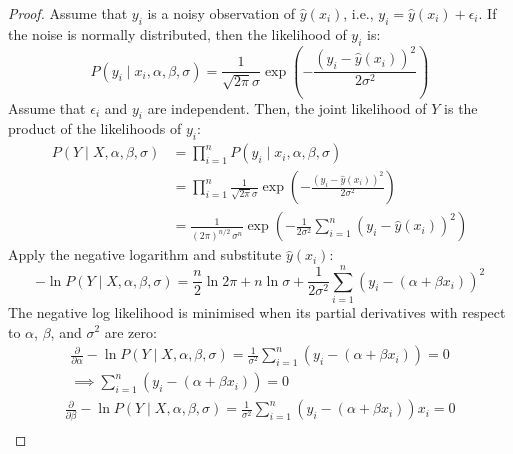 \begin{thm}
  \begin{proof}
    Assume that $y_i$ is a noisy observation of $\hat{y}(x_i)$, i.e.,
    $y_i = \hat{y}(x_i) + \epsilon_i$.
    If the noise is normally distributed, then the likelihood of $y_i$ is:
    \begin{equation}
      P(y_i \mid x_i, \alpha, \beta, \sigma)
      = \frac{1}{\sqrt{2 \pi} \sigma} \exp \left(
      - \frac{(y_i - \hat{y}(x_i))^2}{2 \sigma^2}
      \right)
    \end{equation}
    Assume that $\epsilon_i$ and $y_i$ are independent.
    Then, the joint likelihood of $Y$ is the product of the likelihoods of
    $y_i$:
    \begin{align}
      P(Y \mid X, \alpha, \beta, \sigma)
       & = \prod_{i = 1}^n P(y_i \mid x_i, \alpha, \beta, \sigma)    \\
       & = \prod_{i = 1}^n \frac{1}{\sqrt{2 \pi} \sigma} \exp \left(
      - \frac{(y_i - \hat{y}(x_i))^2}{2 \sigma^2}
      \right)                                                        \\
       & = \frac{1}{(2 \pi)^{n / 2}\,\sigma^n} \exp \left(
      -\frac{1}{2\sigma^2} \sum_{i = 1}^{n} (y_i - \hat{y}(x_i))^2
      \right)
    \end{align}
    Apply the negative logarithm and substitute $\hat{y}(x_i)$:
    \begin{equation}
      - \ln P(Y \mid X, \alpha, \beta, \sigma)
      = \frac{n}{2}\ln 2\pi + n\ln\sigma + \frac{1}{2\sigma^2} \sum_{i = 1}^{n} (y_i - (\alpha + \beta x_i))^2
    \end{equation}
    The negative log likelihood is minimised when its partial derivatives with
    respect to $\alpha$, $\beta$, and $\sigma^2$ are zero:
    \begin{equation}
      \begin{split}
        \frac{\partial}{\partial \alpha} - \ln P(Y \mid X, \alpha, \beta, \sigma)
        = \frac{1}{\sigma^2} \sum_{i = 1}^{n} (y_i - (\alpha + \beta x_i)) = 0 \\
        \implies \sum_{i = 1}^{n} (y_i - (\alpha + \beta x_i)) = 0
      \end{split}
    \end{equation}
    \begin{equation}
      \begin{split}
        \frac{\partial}{\partial \beta} - \ln P(Y \mid X, \alpha, \beta, \sigma)
        = \frac{1}{\sigma^2} \sum_{i = 1}^{n} (y_i - (\alpha + \beta x_i)) x_i = 0 \\

\end{split}
\end{equation}
\end{proof}
\end{thm}
